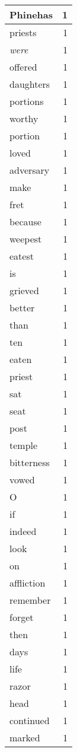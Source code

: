 \begin{center}
\begin{longtable}{l|r}
Phinehas & 1 \\ \hline
priests & 1 \\ \hline
\emph{were} & 1 \\ \hline
offered & 1 \\ \hline
daughters & 1 \\ \hline
portions & 1 \\ \hline
worthy & 1 \\ \hline
portion & 1 \\ \hline
loved & 1 \\ \hline
adversary & 1 \\ \hline
make & 1 \\ \hline
fret & 1 \\ \hline
because & 1 \\ \hline
weepest & 1 \\ \hline
eatest & 1 \\ \hline
is & 1 \\ \hline
grieved & 1 \\ \hline
better & 1 \\ \hline
than & 1 \\ \hline
ten & 1 \\ \hline
eaten & 1 \\ \hline
priest & 1 \\ \hline
sat & 1 \\ \hline
seat & 1 \\ \hline
post & 1 \\ \hline
temple & 1 \\ \hline
bitterness & 1 \\ \hline
vowed & 1 \\ \hline
O & 1 \\ \hline
if & 1 \\ \hline
indeed & 1 \\ \hline
look & 1 \\ \hline
on & 1 \\ \hline
affliction & 1 \\ \hline
remember & 1 \\ \hline
forget & 1 \\ \hline
then & 1 \\ \hline
days & 1 \\ \hline
life & 1 \\ \hline
razor & 1 \\ \hline
head & 1 \\ \hline
continued & 1 \\ \hline
marked & 1 \\ \hline

\end{longtable}
\end{center}
